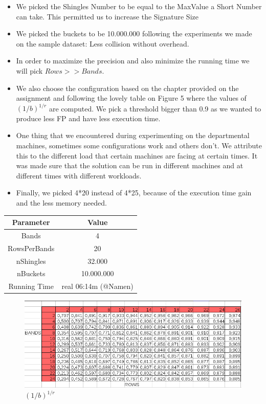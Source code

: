 \documentclass[12pt]{article}
\begin{document}
\begin{itemize}
    \item
    We picked the Shingles Number to be equal to the MaxValue a Short Number can take. This permitted us to increase the Signature Size
    \item 
      We picked the buckets to be 10.000.000 following the experiments we made on the sample dataset: Less collision without overhead.
    \item 
      In order to maximize the precision and also minimize the running time we will pick $Rows >> Bands$.  
    \item
    We also choose the configuration based on the chapter provided on the assignment and following the lovely table on Figure 5 where the values of $(1/b)^{1/r}$ are computed. We pick a threshold bigger than 0.9 as we wanted to produce less FP and have less execution time.
    \item One thing that we encountered during experimenting on the departmental machines, sometimes some configurations work and others don't. We attribute this to the different load that certain machines are facing at certain times. It was made sure that the solution can be run in different machines and at different times with different workloads.

      \item Finally, we picked 4*20 instead of 4*25, because of the execution time gain and the less memory needed.


\end{itemize}

\begin{center}
 \begin{tabular}{||c |  c||}
 \hline
 Parameter & Value \\ [0.5ex]
 \hline\hline
Bands & 4 \\
 \hline
RowsPerBands & 20\\
 \hline
nShingles & 32.000 \\
 \hline
nBuckets & 10.000.000  \\
 \hline
 \hline
Running Time & real 06:14m (@Namen) \\

 \hline

\end{tabular}
\end{center}


\begin{figure}[t]
\caption{$(1/b)^{1/r}$}
\includegraphics[scale=0.6]{threshold.png}
\centering
\end{figure}
\end{document}
